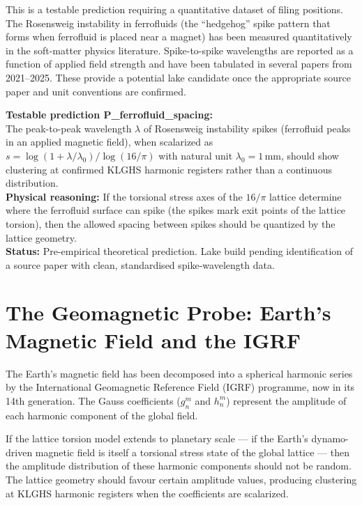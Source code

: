 \documentclass[11pt, letterpaper, openany]{book}
\begin{document}
This is a testable prediction requiring a quantitative dataset of filing
positions. The Rosensweig instability in ferrofluids (the ``hedgehog''
spike pattern that forms when ferrofluid is placed near a magnet) has
been measured quantitatively in the soft-matter physics literature.
Spike-to-spike wavelengths are reported as a function of applied field
strength and have been tabulated in several papers from 2021--2025.
These provide a potential lake candidate once the appropriate source
paper and unit conventions are confirmed.

\begin{predictionbox}
\textbf{Testable prediction P\_ferrofluid\_spacing:}\\[0.5em]
The peak-to-peak wavelength $\lambda$ of Rosensweig instability spikes
(ferrofluid peaks in an applied magnetic field), when scalarized as
$s = \log(1 + \lambda/\lambda_0)/\log(16/\pi)$ with natural unit
$\lambda_0 = 1\,\text{mm}$, should show clustering at confirmed KLGHS
harmonic registers rather than a continuous distribution.\\[0.5em]
\textbf{Physical reasoning:} If the torsional stress axes of the
$16/\pi$ lattice determine where the ferrofluid surface can spike
(the spikes mark exit points of the lattice torsion), then the
allowed spacing between spikes should be quantized by the lattice
geometry.\\[0.5em]
\textbf{Status:} Pre-empirical theoretical prediction. Lake build
pending identification of a source paper with clean, standardised
spike-wavelength data.
\end{predictionbox}

\section{The Geomagnetic Probe: Earth's Magnetic Field and the IGRF}

The Earth's magnetic field has been decomposed into a spherical harmonic
series by the International Geomagnetic Reference Field (IGRF) programme,
now in its 14th generation. The Gauss coefficients ($g_n^m$ and $h_n^m$)
represent the amplitude of each harmonic component of the global field.

If the lattice torsion model extends to planetary scale --- if the Earth's
dynamo-driven magnetic field is itself a torsional stress state of the
global lattice --- then the amplitude distribution of these harmonic
components should not be random. The lattice geometry should favour
certain amplitude values, producing clustering at KLGHS harmonic registers
when the coefficients are scalarized.
\end{document}
